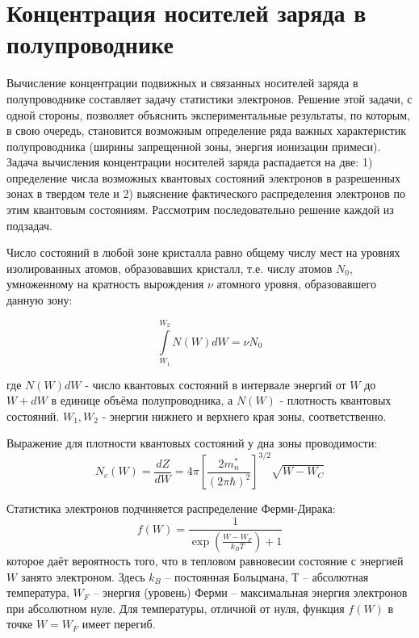 \section{Концентрация носителей заряда в полупроводнике}
Вычисление концентрации подвижных и связанных носителей заряда в полупроводнике составляет задачу статистики электронов.
Решение этой задачи, с одной стороны, позволяет объяснить экспериментальные результаты, по которым, в свою очередь,
становится возможным определение ряда важных характеристик полупроводника (ширины запрещенной зоны, энергия ионизации примеси).
Задача вычисления концентрации носителей заряда распадается на две:  1) определение числа возможных квантовых состояний
электронов в разрешенных зонах в твердом теле и 2) выяснение фактического распределения электронов по этим квантовым
состояниям. Рассмотрим последовательно решение каждой из подзадач.

Число состояний в любой зоне кристалла равно общему числу мест на уровнях изолированных атомов, образовавших кристалл,
т.е. числу атомов $N_0$, умноженному на кратность вырождения $\nu$ атомного уровня, образовавшего данную зону:

\begin{equation}
	\int \limits_{W_1}^{W_2} N(W) dW  =\nu N_0 
	\label{eq:2.1}
\end{equation} 

где $N(W)dW$ - число  квантовых состояний в интервале энергий от $W$ до $W+dW$ в единице объёма полупроводника, а $N(W)$
-  плотность квантовых состояний. $W_1,W_2$ - энергии нижнего и верхнего края зоны, соответственно. 

Выражение для плотности квантовых состояний у дна зоны проводимости:
\begin{equation}
	N_{c}(W)=\frac{d Z}{d W}=4 \pi\left[\frac{2 m_{n}^{*}}{(2 \pi \hbar)^{2}}\right]^{3 / 2} \sqrt{W-W_{C}}
	\label{eq:2.7}
\end{equation} 

Статистика электронов подчиняется распределение Ферми-Дирака:   
\begin{equation}
	f(W) = \frac{1}{\exp(\frac{W-W_F}{k_B T})+1}
	\label{eq:2.8}
\end{equation}
которое даёт вероятность того, что в тепловом равновесии состояние с энергией $W$ занято электроном. Здесь $k_B$ –
постоянная Больцмана, $Т$ – абсолютная температура, $W_F$ – энергия (уровень) Ферми – максимальная энергия электронов при
абсолютном нуле. Для температуры, отличной от нуля, функция $f(W)$ в точке $W = W_F$ имеет перегиб.

